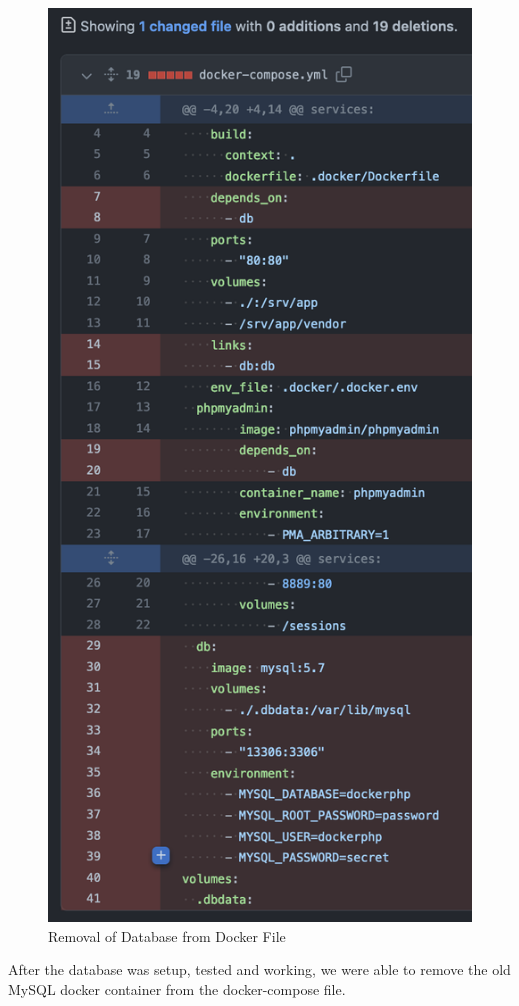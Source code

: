 \begin{figure}[!htbp]
    \centering
    \includegraphics[width=\textwidth]{resources/rds/docker.png}
    \caption{Removal of Database from Docker File}
    \label{fig:rds-rm-docker-compose}
\end{figure}

After the database was setup, tested and working, we were able to remove the old MySQL docker container from the docker-compose file.